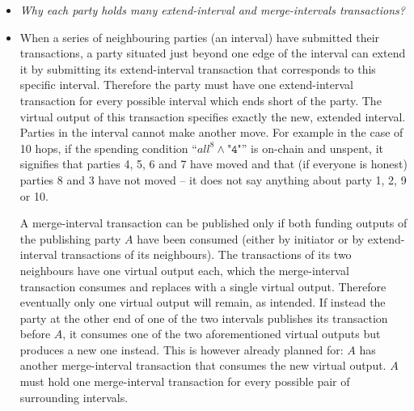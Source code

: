 \begin{itemize}
  \item \emph{Why each party holds many extend-interval and merge-intervals
  transactions?}
  \item When a series of neighbouring parties (an interval) have submitted their
  transactions, a party situated just beyond one edge of the interval can extend
  it by submitting its extend-interval transaction that corresponds to this
  specific interval. Therefore the party must have one extend-interval
  transaction for every possible interval which ends short of the party. The
  virtual output of this transaction specifies exactly the new, extended
  interval. Parties in the interval cannot make another move. For example in the
  case of 10 hops, if the spending condition ``$\mathit{all}^8 \wedge
  \texttt{"4"}$'' is on-chain and unspent, it signifies that parties 4, 5, 6 and
  7 have moved and that (if everyone is honest) parties 8 and 3 have not moved
  -- it does not say anything about party 1, 2, 9 or 10.

  A merge-interval transaction can be published only if both funding outputs of
  the publishing party $A$ have been consumed (either by initiator or by
  extend-interval transactions of its neighbours). The transactions of its two
  neighbours have one virtual output each, which the merge-interval transaction
  consumes and replaces with a single virtual output. Therefore eventually only
  one virtual output will remain, as intended. If instead the party at the other
  end of one of the two intervals publishes its transaction before $A$, it
  consumes one of the two aforementioned virtual outputs but produces a new one
  instead. This is however already planned for: $A$ has another merge-interval
  transaction that consumes the new virtual output. $A$ must hold one
  merge-interval transaction for every possible pair of surrounding intervals.


\end{itemize}
